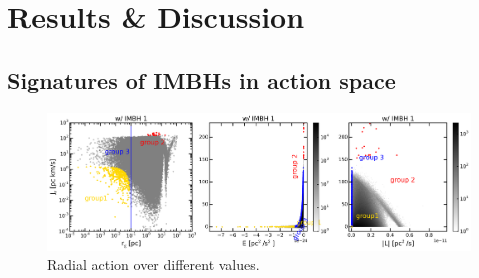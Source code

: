 \section{Results \& Discussion}


\subsection{Signatures of \acp{IMBH} in action space}\label{results}

\begin{figure}[htbp]
\centering
\includegraphics[width=\textwidth]{Plots/J_r_compare_plot.png}
\caption{Radial action over different values.}
\label{fig:J_r_compare}
\end{figure}

